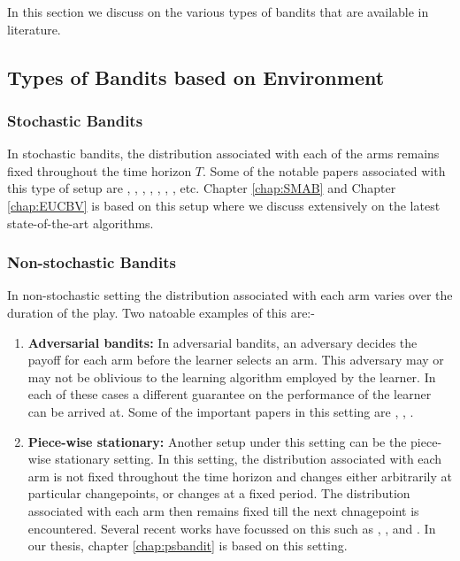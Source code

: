In this section we discuss on the various types of bandits that are available in literature. 


\subsection{Types of Bandits based on Environment}


\subsubsection{Stochastic Bandits}
In stochastic bandits, the distribution associated with each of the arms remains fixed throughout the time horizon $T$. Some of the notable papers associated with this type of setup are \citet{robbins1952some}, \citet{lai1985asymptotically},  \citet{agrawal1995sample}, \citet{auer2002finite}, \citet{auer2010ucb}, \citet{audibert2009minimax}, \citet{lattimore2015optimally}, etc. Chapter \ref{chap:SMAB} and Chapter \ref{chap:EUCBV} is based on this setup where we discuss extensively on the latest state-of-the-art algorithms.



\subsubsection{Non-stochastic Bandits}

In non-stochastic setting the distribution associated with each arm varies over the duration of the play. Two natoable examples of this are:-

\begin{enumerate}
\item \textbf{Adversarial bandits: } In adversarial bandits, an adversary decides the payoff for each arm before the learner selects an arm. This adversary may or may not be oblivious to the learning algorithm employed by the learner. In each of these cases a different guarantee on the performance of the learner can be arrived at. Some of the important papers in this setting are \citet{auer2002nonstochastic}, \citet{auer2002using}, \citet{kocak2014efficient}.

\item \textbf{Piece-wise stationary:} Another setup under this setting can be the piece-wise stationary setting. In this setting, the distribution associated with each arm is not fixed throughout the time horizon and changes either arbitrarily at particular changepoints, or changes at a fixed period. The distribution associated with each arm then  remains fixed till the next chnagepoint is encountered. Several recent works have focussed on this such as  \citep{garivier2011upper}, \citep{mellor2013thompson}, and \citep{allesiardo2017non}. In our thesis, chapter \ref{chap:psbandit} is based on this setting. 
\end{enumerate}


